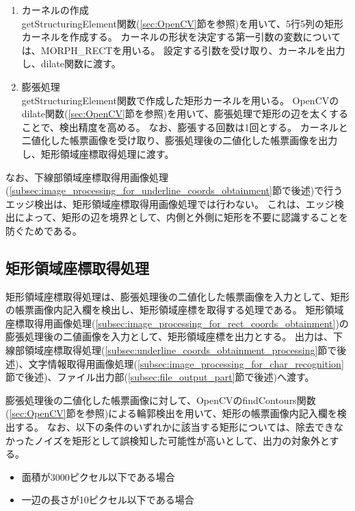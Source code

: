 \begin{enumerate}
    \item カーネルの作成\\
        getStructuringElement関数(\ref{sec:OpenCV}節を参照)を用いて、5行5列の矩形カーネルを作成する。
        カーネルの形状を決定する第一引数の変数については、MORPH\_RECTを用いる。
        設定する引数を受け取り、カーネルを出力し、dilate関数に渡す。
    \item 膨張処理\\
        getStructuringElement関数で作成した矩形カーネルを用いる。
        OpenCVのdilate関数(\ref{sec:OpenCV}節を参照)を用いて、膨張処理で矩形の辺を太くすることで、検出精度を高める。
        なお、膨張する回数は1回とする。
        カーネルと二値化した帳票画像を受け取り、膨張処理後の二値化した帳票画像を出力し、矩形領域座標取得処理に渡す。
\end{enumerate}

なお、下線部領域座標取得用画像処理(\ref{subsec:image_processing_for_underline_coords_obtainment}節で後述)で行うエッジ検出は、矩形領域座標取得用画像処理では行わない。
これは、エッジ検出によって、矩形の辺を境界として、内側と外側に矩形を不要に認識することを防ぐためである。

\subsection{矩形領域座標取得処理}\label{subsec:rect_coords_obtainment_processing}
矩形領域座標取得処理は、膨張処理後の二値化した帳票画像を入力として、矩形の帳票画像内記入欄を検出し、矩形領域座標を取得する処理である。
矩形領域座標取得用画像処理(\ref{subsec:image_processing_for_rect_coords_obtainment})の膨張処理後の二値画像を入力として、矩形領域座標を出力とする。
出力は、下線部領域座標取得処理(\ref{subsec:underline_coords_obtainment_processing}節で後述)、文字情報取得用画像処理(\ref{subsec:image_processing_for_char_recognition}節で後述)、ファイル出力部(\ref{subsec:file_output_part}節で後述)へ渡す。

膨張処理後の二値化した帳票画像に対して、OpenCVのfindContours関数(\ref{sec:OpenCV}節を参照)による輪郭検出を用いて、矩形の帳票画像内記入欄を検出する。
なお、以下の条件のいずれかに該当する矩形については、除去できなかったノイズを矩形として誤検知した可能性が高いとして、出力の対象外とする。

\begin{itemize}
    \item 面積が3000ピクセル以下である場合
    \item 一辺の長さが10ピクセル以下である場合
\end{itemize}

